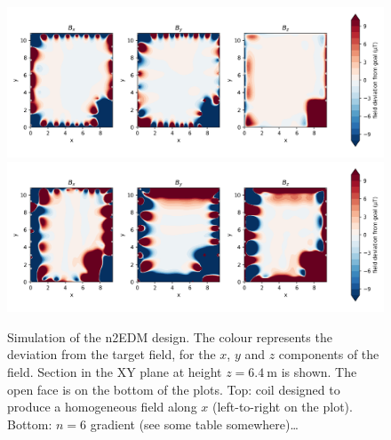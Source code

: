 \begin{figure}
  \centering
  \includegraphics[width=\linewidth]{gfx/prototype/n2EDM_field_Xcoil_XY_z6_4.png}
  \includegraphics[width=\linewidth]{gfx/prototype/n2EDM_field_n6coil_XY_z6_4.png}
  \caption{Simulation of the n2EDM design. The colour represents the deviation from the target field, for the $x$, $y$ and $z$ components of the field. Section in the XY plane at height $z=\SI{6.4}{\meter}$ is shown. The open face is on the bottom of the plots. Top: coil designed to produce a homogeneous field along $x$ (left-to-right on the plot). Bottom: $n=6$ gradient (see some table somewhere)\ldots {}}\label{fig:n2EDM_design_fields}
\end{figure}

